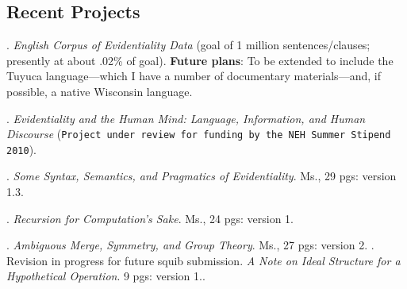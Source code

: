 \documentclass[11pt]{article}
\begin{document}
\subsection{Recent Projects}

\ex. \textsl{English Corpus of Evidentiality Data} (goal of 1 million sentences/clauses; presently at about .02\% of goal). {\bf Future plans}: To be extended to include the Tuyuca language---which I have a number of documentary materials---and, if possible, a native Wisconsin language. 

\ex. \textsl{Evidentiality and the Human Mind: Language, Information, and Human Discourse} (\texttt{Project under review for funding by the NEH Summer Stipend 2010}). 

\ex. \textsl{Some Syntax, Semantics, and Pragmatics of Evidentiality}. Ms., 29 pgs: version 1.3. 

\ex. \textsl{Recursion for Computation's Sake}. Ms., 24 pgs: version 1.

\ex. \textsl{Ambiguous Merge, Symmetry, and Group Theory}. Ms., 27 pgs: version 2. 
\a.  \small{Revision in progress for future squib submission. \textsl{A Note on Ideal Structure for a Hypothetical Operation}. 9 pgs: version 1}..

  
 
\end{document}
